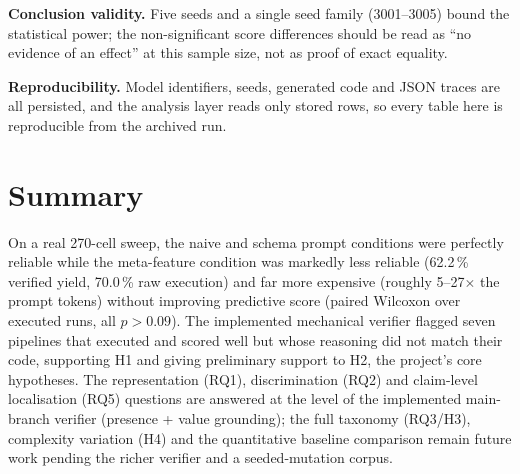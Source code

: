\textbf{Conclusion validity.} Five seeds and a single seed family
(3001--3005) bound the statistical power; the non-significant score
differences should be read as ``no evidence of an effect'' at this
sample size, not as proof of exact equality.

\textbf{Reproducibility.} Model identifiers, seeds, generated code and
JSON traces are all persisted, and the analysis layer reads only
stored rows, so every table here is reproducible from the archived
run.

\section{Summary}

On a real 270-cell sweep, the naive and schema prompt conditions were
perfectly reliable while the meta-feature condition was markedly less
reliable (62.2\,\% verified yield, 70.0\,\% raw execution) and far more
expensive (roughly 5--27$\times$ the prompt tokens) without improving
predictive score (paired Wilcoxon over executed runs, all $p>0.09$). The implemented mechanical verifier
flagged seven pipelines that executed and scored well but whose
reasoning did not match their code, supporting H1 and giving
preliminary support to H2, the project's core hypotheses. The
representation (RQ1), discrimination (RQ2) and claim-level
localisation (RQ5) questions are answered at the level of the
implemented main-branch verifier (presence + value grounding); the
full taxonomy (RQ3/H3), complexity
variation (H4) and the quantitative baseline comparison remain future
work pending the richer verifier and a seeded-mutation corpus.
